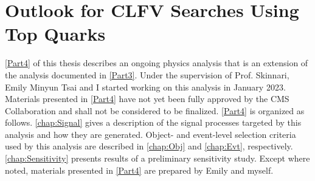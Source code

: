 \part{Outlook for CLFV Searches Using Top Quarks}
\label{Part4}
\autoref{Part4} of this thesis describes an ongoing physics analysis that is an extension of the analysis documented in \autoref{Part3}. Under the supervision of Prof. Skinnari, Emily Minyun Tsai and I started working on this analysis in January 2023. Materials presented in \autoref{Part4} have not yet been fully approved by the \ac{CMS} Collaboration and shall not be considered to be finalized. \autoref{Part4} is organized as follows. \autoref{chap:Signal} gives a description of the signal processes targeted by this analysis and how they are generated. Object- and event-level selection criteria used by this analysis are described in \autoref{chap:Obj} and \autoref{chap:Evt}, respectively. \autoref{chap:Sensitivity} presents results of a preliminary sensitivity study. Except where noted, materials presented in \autoref{Part4} are prepared by Emily and myself.





